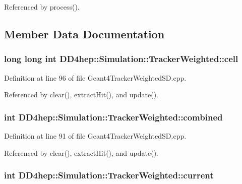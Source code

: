 Referenced by process().

\subsection{Member Data Documentation}
\hypertarget{struct_d_d4hep_1_1_simulation_1_1_tracker_weighted_aeced4bab28aa79ad7bab14ca9ce02c79}{
\subsubsection[{cell}]{\setlength{\rightskip}{0pt plus 5cm}long long int {\bf DD4hep::Simulation::TrackerWeighted::cell}}}
\label{struct_d_d4hep_1_1_simulation_1_1_tracker_weighted_aeced4bab28aa79ad7bab14ca9ce02c79}


Definition at line 96 of file Geant4TrackerWeightedSD.cpp.

Referenced by clear(), extractHit(), and update().\hypertarget{struct_d_d4hep_1_1_simulation_1_1_tracker_weighted_a7059ba8b2d85cb67220b0184f038f9f9}{
\subsubsection[{combined}]{\setlength{\rightskip}{0pt plus 5cm}int {\bf DD4hep::Simulation::TrackerWeighted::combined}}}
\label{struct_d_d4hep_1_1_simulation_1_1_tracker_weighted_a7059ba8b2d85cb67220b0184f038f9f9}


Definition at line 91 of file Geant4TrackerWeightedSD.cpp.

Referenced by clear(), extractHit(), and update().\hypertarget{struct_d_d4hep_1_1_simulation_1_1_tracker_weighted_ac6ff7cabaf1b1b455979409184e72966}{
\subsubsection[{current}]{\setlength{\rightskip}{0pt plus 5cm}int {\bf DD4hep::Simulation::TrackerWeighted::current}}}
\label{struct_d_d4hep_1_1_simulation_1_1_tracker_weighted_ac6ff7cabaf1b1b455979409184e72966}



